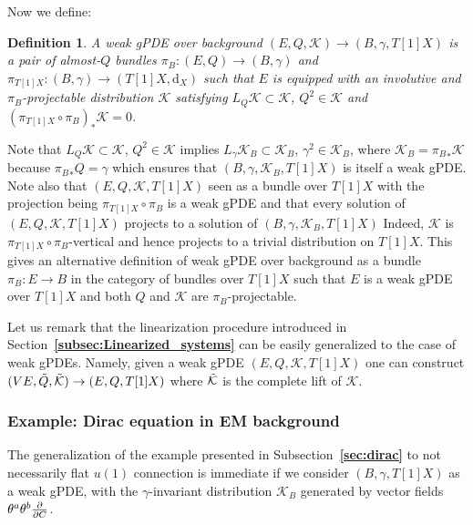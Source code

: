 \documentclass[a4paper,12pt]{article}
\numberwithin{equation}{section} %
\newtheorem{definition}[thm]{Definition}
\newcommand{\bref}[1]{\textbf{\ref{#1}}}
\newcommand{\dx}{\mathrm{d}_X}
\renewcommand{\d}{\partial}
\newcommand{\ffrac}[2]{\raisebox{.5pt}%
  {\footnotesize$\displaystyle\frac{#1}{#2}$}\kern1pt}
\newcommand{\dl}[1]{\mathchoice{\ffrac{\d}{\d #1}}{\frac{\d}{\d #1}}{\ffrac{\d}{\d #1}}{\ffrac{\d}{\d #1}}}
\def\cK{\mathcal{K}}
\begin{document}


Now we define:
\begin{definition}
A weak gPDE over background $(E,Q,\cK)\rightarrow (B,\gamma, T[1]X)$ is a pair of almost-$Q$ bundles  ${\pi_B}:(E,Q)\to (B,\gamma)$ and $\pi_{T[1]X}:(B,\gamma)\to (T[1]X,\dx)$ such that $E$ is equipped with an involutive and ${\pi_B}$-projectable distribution $\cK$ satisfying $L_Q\cK \subset \cK$, $Q^2\in\cK$ and $(\pi_{T[1]X}{} \circ {\pi_B})_*  \cK = 0$.
\end{definition}
Note that $L_Q\cK \subset \cK$, $Q^2\in\cK$ implies $L_\gamma \cK_B\subset \cK_B$, $\gamma^2 \in \cK_B$, where $\cK_B={\pi_B}_*\cK$ because ${\pi_B}_*Q=\gamma$ which ensures that $(B,\gamma, \cK_B,T[1]X)$ is itself a weak gPDE. Note also that $(E,Q,\cK,T[1]X)$ seen as a bundle over $T[1]X$ with the projection being $\pi_{T[1]X}\circ {\pi_B}$ is a weak gPDE and
that every solution of $(E,Q,\cK,T[1]X)$ projects to a solution of $(B,\gamma,\cK_B,T[1]X)$
Indeed, $\cK$ is $\pi_{T[1]X}\circ {\pi_B}$-vertical and hence projects to a trivial distribution on $T[1]X$. This gives an alternative definition of weak gPDE over background as a bundle ${\pi_B}:E\to B$ in the category of bundles over $T[1]X$ such that $E$ is a weak gPDE over $T[1]X$ and both $Q$ and $\cK$ are ${\pi_B}$-projectable.


Let us remark that the linearization procedure introduced in Section~\bref{subsec:Linearized_systems} can be easily generalized to the case of weak gPDEs. Namely, given a weak gPDE $(E,Q,\cK, T[1]X)$ one can construct $(VE,\Tilde{Q}, \Tilde{\cK}) \rightarrow (E,Q,T[1]X)$ where $\Tilde{\cK}$ is the complete lift of $\cK$.

\subsubsection{Example: Dirac equation in EM background} \label{sec:weak-dirac}

The generalization of the example presented in Subsection~\bref{sec:dirac} to not necessarily flat $u(1)$ connection is immediate if we consider $(B,\gamma, T[1]X)$ as a weak gPDE, with the $\gamma$-invariant distribution $\cK_B$ generated by vector fields $\theta^a\theta^b\dl{C}$. 
\end{document}
